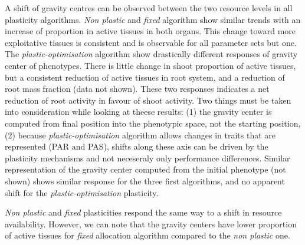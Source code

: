 A shift of gravity centres can be observed between the two resource levels in all plasticity algorithms. \textit{Non plastic} and \textit{fixed} algorithm show similar trends with an increase of proportion in active tissues in both organs. This change toward more exploitative tissues is consistent and is observable for all parameter sets but one. The \textit{plastic-optimisation} algorithm show drastically different responses of gravity center of phenotypes. There is little change in shoot proportion of active tissues, but a consistent reduction of active tissues in root system, and a reduction of root mass fraction (data not shown). These two responses indicates a net reduction of root activity in favour of shoot activity. Two things must be taken into consideration while looking at theese results: (1) the gravity center is computed from final position into the phenotypic space, not the starting position, (2) because \textit{plastic-optimisation} algorithm allows changes in traits that are represented (PAR and PAS), shifts along these axis can be driven by the plasticity mechanisms and not neceseraly only performance differences. Similar representation of the gravity center computed from the initial phenotype (not shown) shows similar response for the three first algorithms, and no apparent shift for the \textit{plastic-optimisation} plasticity.

\textit{Non plastic} and \textit{fixed} plasticities respond the same way to a shift in resource availability. However, we can note that the gravity centers have lower proportion of active tissues for \textit{fixed} allocation algorithm compared to the \textit{non plastic} one.

